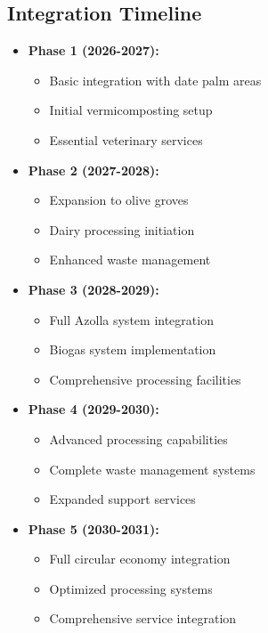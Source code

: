 \subsection{Integration Timeline}
\begin{itemize}
    \item \textbf{Phase 1 (2026-2027):}
    \begin{itemize}
        \item Basic integration with date palm areas
        \item Initial vermicomposting setup
        \item Essential veterinary services
    \end{itemize}
    
    \item \textbf{Phase 2 (2027-2028):}
    \begin{itemize}
        \item Expansion to olive groves
        \item Dairy processing initiation
        \item Enhanced waste management
    \end{itemize}
    
    \item \textbf{Phase 3 (2028-2029):}
    \begin{itemize}
        \item Full Azolla system integration
        \item Biogas system implementation
        \item Comprehensive processing facilities
    \end{itemize}
    
    \item \textbf{Phase 4 (2029-2030):}
    \begin{itemize}
        \item Advanced processing capabilities
        \item Complete waste management systems
        \item Expanded support services
    \end{itemize}
    
    \item \textbf{Phase 5 (2030-2031):}
    \begin{itemize}
        \item Full circular economy integration
        \item Optimized processing systems
        \item Comprehensive service integration
    \end{itemize}
\end{itemize}
